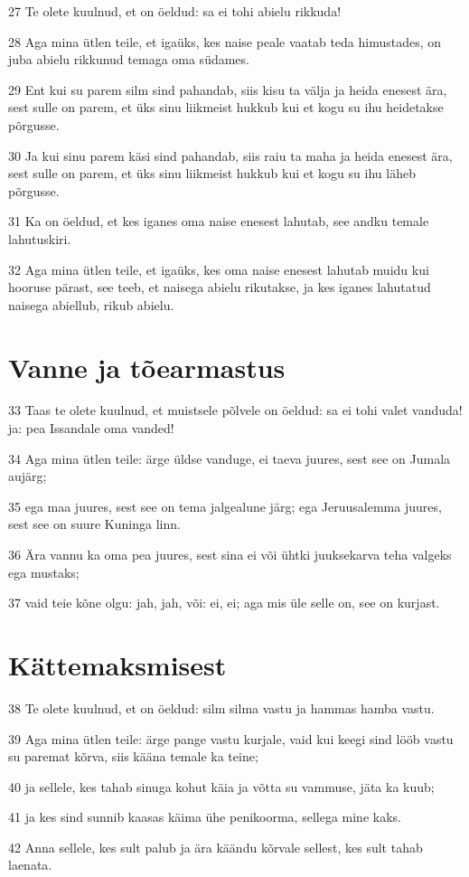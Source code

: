 \par 27 Te olete kuulnud, et on öeldud: sa ei tohi abielu rikkuda!
\par 28 Aga mina ütlen teile, et igaüks, kes naise peale vaatab teda himustades, on juba abielu rikkunud temaga oma südames.
\par 29 Ent kui su parem silm sind pahandab, siis kisu ta välja ja heida enesest ära, sest sulle on parem, et üks sinu liikmeist hukkub kui et kogu su ihu heidetakse põrgusse.
\par 30 Ja kui sinu parem käsi sind pahandab, siis raiu ta maha ja heida enesest ära, sest sulle on parem, et üks sinu liikmeist hukkub kui et kogu su ihu läheb põrgusse.
\par 31 Ka on öeldud, et kes iganes oma naise enesest lahutab, see andku temale lahutuskiri.
\par 32 Aga mina ütlen teile, et igaüks, kes oma naise enesest lahutab muidu kui hooruse pärast, see teeb, et naisega abielu rikutakse, ja kes iganes lahutatud naisega abiellub, rikub abielu.

\section*{Vanne ja tõearmastus}

\par 33 Taas te olete kuulnud, et muistsele põlvele on öeldud: sa ei tohi valet vanduda! ja: pea Issandale oma vanded!
\par 34 Aga mina ütlen teile: ärge üldse vanduge, ei taeva juures, sest see on Jumala aujärg;
\par 35 ega maa juures, sest see on tema jalgealune järg; ega Jeruusalemma juures, sest see on suure Kuninga linn.
\par 36 Ära vannu ka oma pea juures, sest sina ei või ühtki juuksekarva teha valgeks ega mustaks;
\par 37 vaid teie kõne olgu: jah, jah, või: ei, ei; aga mis üle selle on, see on kurjast.

\section*{Kättemaksmisest}

\par 38 Te olete kuulnud, et on öeldud: silm silma vastu ja hammas hamba vastu.
\par 39 Aga mina ütlen teile: ärge pange vastu kurjale, vaid kui keegi sind lööb vastu su paremat kõrva, siis kääna temale ka teine;
\par 40 ja sellele, kes tahab sinuga kohut käia ja võtta su vammuse, jäta ka kuub;
\par 41 ja kes sind sunnib kaasas käima ühe penikoorma, sellega mine kaks.
\par 42 Anna sellele, kes sult palub ja ära käändu kõrvale sellest, kes sult tahab laenata.


